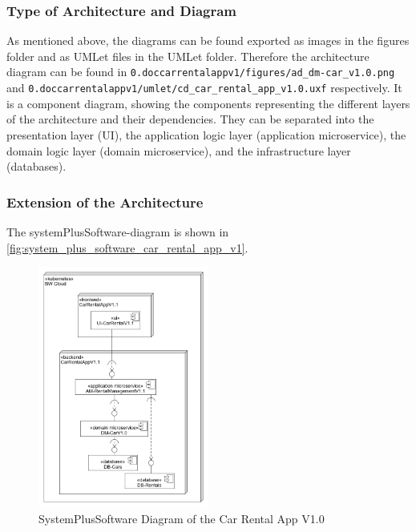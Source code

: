 \subsubsection*{Type of Architecture and Diagram}
As mentioned above, the diagrams can be found exported as images in the figures folder and as UMLet files in the UMLet folder.
Therefore the architecture diagram can be found in \texttt{0.doccarrentalappv1/figures/ad\_dm-car\_v1.0.png} and \hfill \linebreak \texttt{0.doccarrentalappv1/umlet/cd\_car\_rental\_app\_v1.0.uxf} respectively.
It is a component diagram, showing the components representing the different layers of the architecture and their dependencies.
They can be separated into the presentation layer (UI), the application logic layer (application microservice), the domain logic layer (domain microservice), and the infrastructure layer (databases).

\subsubsection*{Extension of the Architecture}
The systemPlusSoftware-diagram is shown in \autoref{fig:system_plus_software_car_rental_app_v1}.

\begin{figure}
    \centering
    \includegraphics[width=0.5\textwidth]{figures/microservices/introduction/ms_intro_spsdCarRentalV1.png}
    \caption{SystemPlusSoftware Diagram of the Car Rental App V1.0}
    \label{fig:system_plus_software_car_rental_app_v1}
\end{figure}
